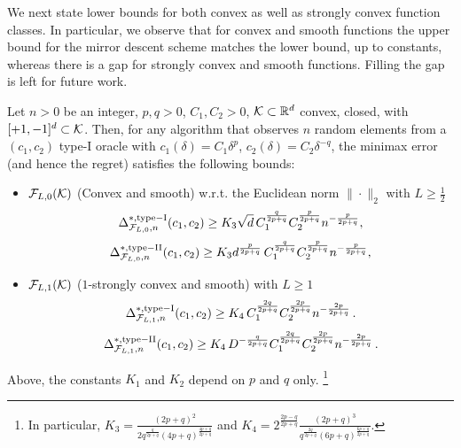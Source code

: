 We next state lower bounds for both convex as well as strongly convex function classes. In particular, we observe that for convex and smooth functions the upper bound for the mirror descent scheme matches the lower bound, up to constants, whereas there is a gap for strongly convex and smooth functions.
Filling the gap is left for future work.
\begin{theorem}
\label{thm:lb-convex}
Let $n>0$ be an integer, $p,q>0$, $C_1,C_2>0$, 
$\mathcal{K}\subset \mathbb{R}^d$ convex, closed, with  $[+1,-1]^d\subset \mathcal{K}$.
Then, for any algorithm that observes $n$ random elements from a $(c_1,c_2)$ type-I oracle 
 with $c_1(\delta) = C_1 \delta^p$, $c_2(\delta) = C_2 \delta^{-q}$,
 the minimax error (and hence the regret) satisfies the following bounds:
 \begin{itemize}
 \item
${\mathcal{F}_{L,0}(\mathcal{K})}$ (Convex and smooth) w.r.t. the Euclidean norm $\|\cdot\|_2$ with $L\ge \frac12$
\[
 \Delta_{\F_{L,0},n}^{*, \mathrm{type-I}}(c_1,c_2) \ge K_3\sqrt{d} \, C_1^{\frac{q}{2p+q}} C_2^{\frac{p}{2p+q}} n^{-\frac{p}{2p+q}}, %
\]
\[
 \Delta_{\F_{L,0},n}^{*, \mathrm{type-II}}(c_1,c_2) \ge K_3d^{\frac{p}{2p+q}} \, C_1^{\frac{q}{2p+q}} C_2^{\frac{p}{2p+q}} n^{-\frac{p}{2p+q}}, %
\]
\item
${\mathcal{F}_{L,1}(\mathcal{K})}$ ($1$-strongly convex and smooth) with $L\ge 1$
\[
\Delta_{\F_{L,1}, n}^{*, \mathrm{type-I}}(c_1,c_2) \ge K_4 \,  C_1^{\frac{2q}{2p+q}} C_2^{\frac{2p}{2p+q}} n^{-\frac{2p}{2p+q}}\,. %
\]
\[
\Delta_{\F_{L,1}, n}^{*, \mathrm{type-II}}(c_1,c_2) \ge K_4 \,  D^{-\frac{q}{2p+q}}C_1^{\frac{2q}{2p+q}} C_2^{\frac{2p}{2p+q}} n^{-\frac{2p}{2p+q}}\,. %
\]
\end{itemize}
Above,
the constants $K_1$ and $K_2$ depend on $p$ and $q$ only.%
\footnote{
In particular,
$K_3= \frac{\left(2p+q\right)^2}{2q^{\frac{q}{2p+q}}\left(4p+q\right)^{\frac{4p+q}{2p+q}}}$
and
$K_4= 2^{\frac{2p-q}{2p+q}} \frac{(2p+q)^3}{q^{\frac{2q}{2p+q}}(6p+q)^{\frac{6p+q}{2p+q}}}$.}
\end{theorem}

